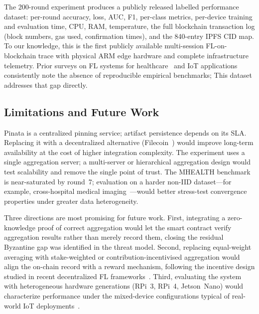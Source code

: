 \documentclass{llncs}
\begin{document}
The 200-round experiment produces a publicly released labelled performance
dataset: per-round accuracy, loss, AUC, F1, per-class metrics, per-device
training and evaluation time, CPU, RAM, temperature, the full blockchain
transaction log (block numbers, gas used, confirmation times), and the
840-entry IPFS CID map. To our knowledge, this is the first publicly
available multi-session FL-on-blockchain trace with physical ARM edge
hardware and complete infrastructure telemetry. Prior surveys on FL systems for healthcare~\cite{qammar2023securing} and IoT
applications~\cite{yang2024blockchain,issa2023survey,bayan2025permissionless}
consistently note the absence of reproducible empirical benchmarks;
This dataset addresses that gap directly.

\subsection{Limitations and Future Work}

Pinata is a centralized pinning service; artifact persistence depends on
its SLA. Replacing it with a decentralized alternative
(Filecoin~\cite{protocol2020filecoin}) would improve long-term
availability at the cost of higher integration complexity. The
experiment uses a single aggregation server; a multi-server or
hierarchical aggregation design would test scalability and remove the
single point of trust. The MHEALTH benchmark is near-saturated by
round~7; evaluation on a harder non-IID dataset---for example,
cross-hospital medical imaging~\cite{qu2022blockchain}---would better
stress-test convergence properties under greater data heterogeneity.

Three directions are most promising for future work. First, integrating
a zero-knowledge proof of correct aggregation would let the smart contract
verify aggregation results rather than merely record them, closing the
residual Byzantine gap was identified in the threat model. Second, replacing
equal-weight averaging with stake-weighted or contribution-incentivised
aggregation would align the on-chain record with a reward mechanism,
following the incentive design studied in recent decentralized FL
frameworks~\cite{beltran2026decfl,zhu2026fedERFT,bayan2024privacy}.
Third, evaluating the system with heterogeneous hardware generations
(RPi~3, RPi~4, Jetson~Nano) would characterize performance under the
mixed-device configurations typical of real-world IoT
deployments~\cite{albogamy2025iotfl,minh2025iiot}.


\FloatBarrier
\end{document}
